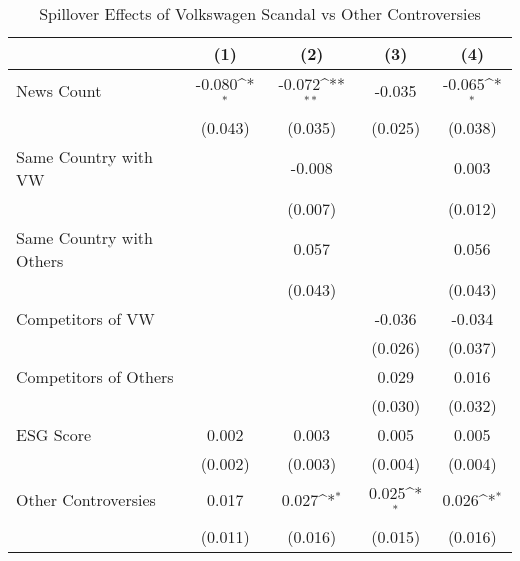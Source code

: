 \begin{table}[htbp]\centering
\def\sym#1{\ifmmode^{#1}\else\(^{#1}\)\fi}
\caption{Spillover Effects of Volkswagen Scandal vs Other Controversies}
\begin{tabular}{l*{4}{c}}
\toprule
                    &\multicolumn{1}{c}{(1)}         &\multicolumn{1}{c}{(2)}         &\multicolumn{1}{c}{(3)}         &\multicolumn{1}{c}{(4)}         \\
\midrule
News Count          &      -0.080\sym{*}  &      -0.072\sym{**} &      -0.035         &      -0.065\sym{*}  \\
                    &     (0.043)         &     (0.035)         &     (0.025)         &     (0.038)         \\
\addlinespace
Same Country with VW&                     &      -0.008         &                     &       0.003         \\
                    &                     &     (0.007)         &                     &     (0.012)         \\
\addlinespace
Same Country with Others&                     &       0.057         &                     &       0.056         \\
                    &                     &     (0.043)         &                     &     (0.043)         \\
\addlinespace
Competitors of VW   &                     &                     &      -0.036         &      -0.034         \\
                    &                     &                     &     (0.026)         &     (0.037)         \\
\addlinespace
Competitors of Others&                     &                     &       0.029         &       0.016         \\
                    &                     &                     &     (0.030)         &     (0.032)         \\
\addlinespace
ESG Score           &       0.002         &       0.003         &       0.005         &       0.005         \\
                    &     (0.002)         &     (0.003)         &     (0.004)         &     (0.004)         \\
\addlinespace
Other Controversies &       0.017         &       0.027\sym{*}  &       0.025\sym{*}  &       0.026\sym{*}  \\
                    &     (0.011)         &     (0.016)         &     (0.015)         &     (0.016)         \\

\end{tabular}
\end{table}
